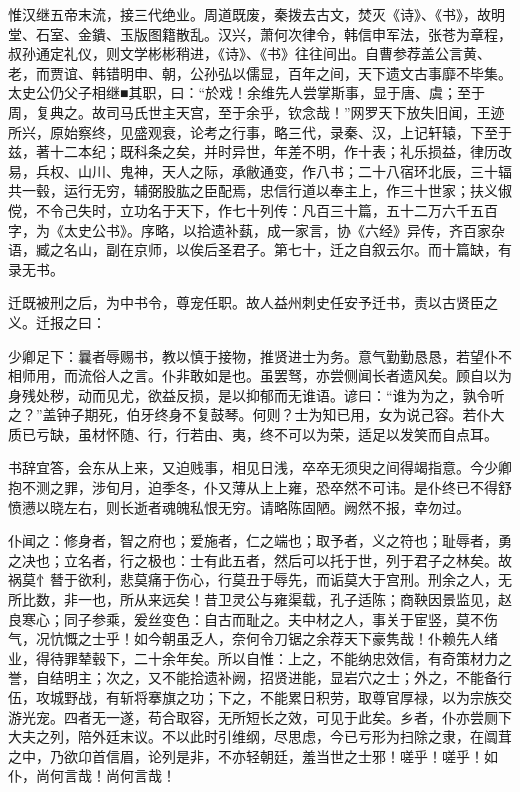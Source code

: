 \documentclass[]{article}
\begin{document}
惟汉继五帝末流，接三代绝业。周道既废，秦拨去古文，焚灭《诗》、《书》，故明堂、石室、金鐀、玉版图籍散乱。汉兴，萧何次律令，韩信申军法，张苍为章程，叔孙通定礼仪，则文学彬彬稍进，《诗》、《书》往往间出。自曹参荐盖公言黄、老，而贾谊、韩错明申、朝，公孙弘以儒显，百年之间，天下遗文古事靡不毕集。太史公仍父子相继■其职，曰：``於戏！余维先人尝掌斯事，显于唐、虞；至于周，复典之。故司马氏世主天宫，至于余乎，钦念哉！''网罗天下放失旧闻，王迹所兴，原始察终，见盛观衰，论考之行事，略三代，录秦、汉，上记轩辕，下至于兹，著十二本纪；既科条之矣，并时异世，年差不明，作十表；礼乐损益，律历改易，兵权、山川、鬼神，天人之际，承敝通变，作八书；二十八宿环北辰，三十辐共一毂，运行无穷，辅弼股肱之臣配焉，忠信行道以奉主上，作三十世家；扶义俶傥，不令己失时，立功名于天下，作七十列传：凡百三十篇，五十二万六千五百字，为《太史公书》。序略，以拾遗补蓺，成一家言，协《六经》异传，齐百家杂语，臧之名山，副在京师，以俟后圣君子。第七十，迁之自叙云尔。而十篇缺，有录无书。

迁既被刑之后，为中书令，尊宠任职。故人益州刺史任安予迁书，责以古贤臣之义。迁报之曰：

少卿足下：曩者辱赐书，教以慎于接物，推贤进士为务。意气勤勤恳恳，若望仆不相师用，而流俗人之言。仆非敢如是也。虽罢驽，亦尝侧闻长者遗风矣。顾自以为身残处秽，动而见尤，欲益反损，是以抑郁而无谁语。谚曰：``谁为为之，孰令听之？''盖钟子期死，伯牙终身不复鼓琴。何则？士为知已用，女为说己容。若仆大质已亏缺，虽材怀随、行，行若由、夷，终不可以为荣，适足以发笑而自点耳。

书辞宜答，会东从上来，又迫贱事，相见日浅，卒卒无须臾之间得竭指意。今少卿抱不测之罪，涉旬月，迫季冬，仆又薄从上上雍，恐卒然不可讳。是仆终已不得舒愤懑以晓左右，则长逝者魂魄私恨无穷。请略陈固陋。阙然不报，幸勿过。

仆闻之：修身者，智之府也；爱施者，仁之端也；取予者，义之符也；耻辱者，勇之决也；立名者，行之极也：士有此五者，然后可以托于世，列于君子之林矣。故祸莫忄朁于欲利，悲莫痛于伤心，行莫丑于辱先，而诟莫大于宫刑。刑余之人，无所比数，非一也，所从来远矣！昔卫灵公与雍渠载，孔子适陈；商鞅因景监见，赵良寒心；同子参乘，爰丝变色：自古而耻之。夫中材之人，事关于宦竖，莫不伤气，况忼慨之士乎！如今朝虽乏人，奈何令刀锯之余荐天下豪隽哉！仆赖先人绪业，得待罪辇毂下，二十余年矣。所以自惟：上之，不能纳忠效信，有奇策材力之誉，自结明主；次之，又不能拾遗补阙，招贤进能，显岩穴之士；外之，不能备行伍，攻城野战，有斩将搴旗之功；下之，不能累日积劳，取尊官厚禄，以为宗族交游光宠。四者无一遂，苟合取容，无所短长之效，可见于此矣。乡者，仆亦尝厕下大夫之列，陪外廷末议。不以此时引维纲，尽思虑，今已亏形为扫除之隶，在阘茸之中，乃欲卬首信眉，论列是非，不亦轻朝廷，羞当世之士邪！嗟乎！嗟乎！如仆，尚何言哉！尚何言哉！
\end{document}
